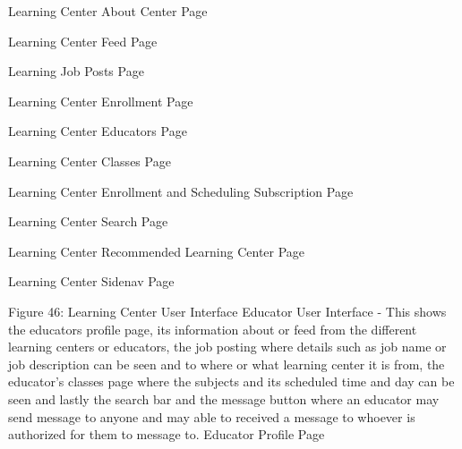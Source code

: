 Learning Center About Center Page
   









Learning Center Feed Page









Learning Job Posts Page 
	









Learning Center Enrollment Page
 








Learning Center Educators Page 
                             

Learning Center Classes Page 











Learning Center Enrollment and Scheduling Subscription Page 












Learning Center Search Page







Learning Center Recommended Learning Center Page









Learning Center Sidenav Page









Figure 46: Learning Center User Interface
Educator User Interface - This shows the educators profile page, its information about or feed from the different learning centers or educators, the job posting where details such as job name or job description can be seen and to where or what learning center it is from, the educator’s classes page where the subjects and its scheduled time and day can be seen and lastly the search bar and the message button where an educator may send message to anyone and may able to received a message to whoever is authorized for them to message to.
Educator Profile Page
















